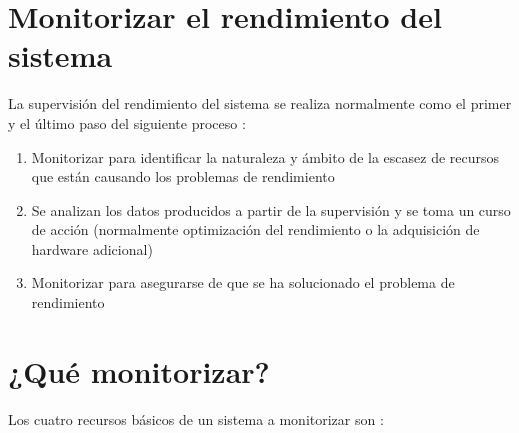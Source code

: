 \documentclass[12pt]{article}
\begin{document}
\section*{Monitorizar el rendimiento del sistema}

La supervisión del rendimiento del sistema se realiza normalmente como el primer y el último paso del siguiente proceso :

\begin{enumerate}
\item Monitorizar para identificar la naturaleza y ámbito de la escasez de recursos que están causando los problemas de rendimiento

\item Se analizan los datos producidos a partir de la supervisión y se toma un curso de acción (normalmente optimización del rendimiento o la adquisición de hardware adicional)

\item Monitorizar para asegurarse de que se ha solucionado el problema de rendimiento

\end{enumerate}

 	





\section*{¿Qué monitorizar?}

Los cuatro recursos básicos de un sistema a monitorizar son :
\end{document}
